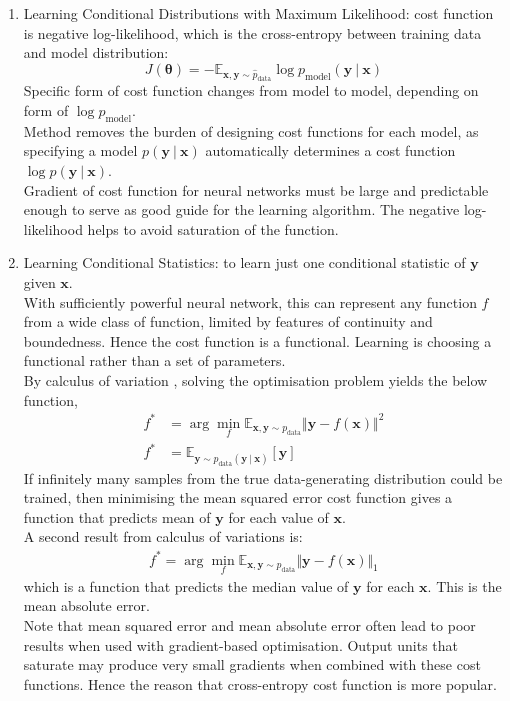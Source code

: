 \begin{definition} 
\begin{enumerate}[label=\roman*.]
\setlength{\itemsep}{0pt}
\item Learning Conditional Distributions with Maximum Likelihood: cost function is negative log-likelihood, which is the cross-entropy between training data and model distribution:
\begin{equation*}
J(\bm{\theta}) = - \mathbb{E}_{\bm{x}, \bm{y} \sim \hat{p}_{\text{data}}} \log p_{\text{model}}(\bm{y} \ \vert \ \bm{x}) \nonumber
\end{equation*}
Specific form of cost function changes from model to model, depending on form of $\log p_{\text{model}}$.\\
Method removes the burden of designing cost functions for each model, as specifying a model $p(\bm{y} \ \vert \ \bm{x})$ automatically determines a cost function $\log p(\bm{y} \ \vert \ \bm{x})$.\\
Gradient of cost function for neural networks must be large and predictable enough to serve as good guide for the learning algorithm. The negative log-likelihood helps to avoid saturation of the function.
\item Learning Conditional Statistics: to learn just one conditional statistic of $\bm{y}$ given $\bm{x}$.\\
With sufficiently powerful neural network, this can represent any function $f$ from a wide class of function, limited by features of continuity and boundedness. Hence the cost function is a functional. Learning is choosing a functional rather than a set of parameters.\\
By calculus of variation	, solving the optimisation problem yields the below function,
\begin{align*}
f^* &= \arg \min_f \mathbb{E}_{\bm{x}, \bm{y} \sim p_{\text{data}}} \Vert \bm{y} - f(\bm{x}) \Vert^2 \nonumber \\
f^* &= \mathbb{E}_{\bm{y} \sim p_{\text{data}}(\bm{y} \ \vert \ \bm{x})} [\bm{y}] \nonumber
\end{align*}
If infinitely many samples from the true data-generating distribution could be trained, then minimising the mean squared error cost function gives a function that predicts mean of $\bm{y}$ for each value of $\bm{x}$.\\
A second result from calculus of variations is:
\begin{align*}
f^* = \arg \min_f \mathbb{E}_{\bm{x}, \bm{y} \sim p_{\text{data}}} \Vert \bm{y} - f(\bm{x}) \Vert_1 \nonumber
\end{align*}
which is a function that predicts the median value of $\bm{y}$ for each $\bm{x}$. This is the mean absolute error.\\
Note that mean squared error and mean absolute error often lead to poor results when used with gradient-based optimisation. Output units that saturate may produce very small gradients when combined with these cost functions. Hence the reason that cross-entropy cost function is more popular.
\end{enumerate}
\end{definition}

